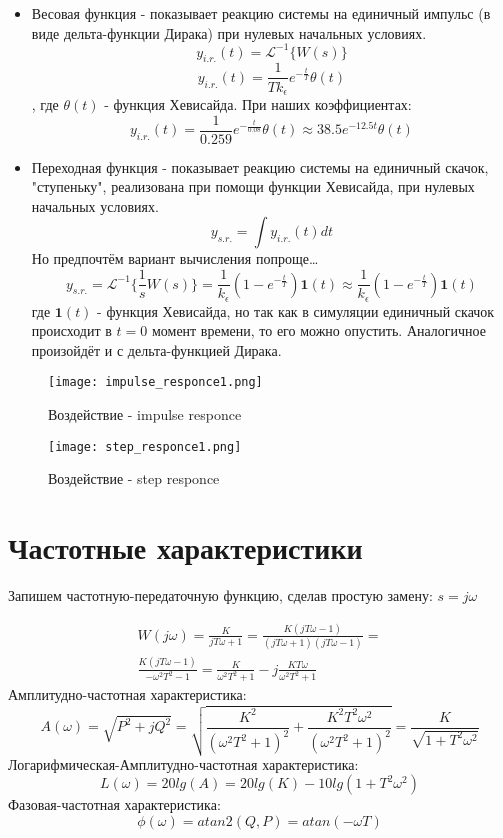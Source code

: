 \begin{itemize}

\item Весовая функция - показывает реакцию системы на единичный импульс (в виде дельта-функции Дирака) при нулевых начальных условиях.
$$
y_{i.r.}(t) = \mathcal{L}^{-1}\{W(s)\}
$$
$$
y_{i.r.}(t) = \frac{1}{Tk_\epsilon}e^{-\frac{t}{T}}\theta(t)
$$, где $\theta(t)$ - функция Хевисайда. При наших коэффициентах:
$$
y_{i.r.}(t) = \frac{1}{0.259}e^{-\frac{t}{0.08}}\theta(t) \approx 38.5e^{-12.5t}\theta(t)
$$

\item Переходная функция - показывает реакцию системы на единичный скачок, "ступеньку", реализована при помощи функции Хевисайда, при нулевых начальных условиях.
$$
y_{s.r.} = \int y_{i.r.}(t) dt
$$
Но предпочтём вариант вычисления попроще\dots
$$
y_{s.r.} = \mathcal{L}^{-1}\{\frac{1}{s}W(s)\} = \frac{1}{k_\epsilon}(1-e^{-\frac{t}{T}})\textbf{1}(t) \approx \frac{1}{k_\epsilon}(1-e^{-\frac{t}{T}})\textbf{1}(t)
$$
где $\textbf{1}(t)$ - функция Хевисайда, но так как в симуляции единичный скачок происходит в $t=0$ момент времени, то его можно опустить. Аналогичное произойдёт и с дельта-функцией Дирака.
\end{itemize}


\begin{figure}[ht]
  \centering
  \texttt{[image: impulse\_responce1.png]}
  \caption{Воздействие - \textrm{impulse responce}}
\end{figure}
\newpage
\begin{figure}[ht]
    \centering
    \texttt{[image: step\_responce1.png]}
    \caption{Воздействие - \textrm{step responce}}
  \end{figure}
\newpage

\section{Частотные характеристики}

Запишем частотную-передаточную функцию, сделав простую замену: $s = j\omega$

$$
\begin{aligned}
  W(j\omega) = \frac{K}{jT\omega + 1} = \frac{K(jT\omega - 1)}{(jT\omega + 1)(jT\omega - 1)} = \\
    \frac{K(jT \omega - 1)}{ -\omega^2 T^2 - 1} = \frac{K}{ \omega^2 T^2 + 1} - j\frac{KT\omega }{ \omega^2 T^2 + 1} 
\end{aligned}
$$
Амплитудно-частотная характеристика:
$$
A(\omega) = \sqrt{P^2 + jQ^2} = \sqrt{\frac{K^2}{(\omega^2 T^2 + 1)^2} + \frac{K^2T^2\omega^2}{(\omega^2 T^2 + 1)^2} } = \frac{K}{\sqrt{1+T^2\omega^2}}
$$
Логарифмическая-Амплитудно-частотная характеристика:
$$
L(\omega) = 20lg(A) = 20lg(K) - 10lg(1+T^2\omega^2)
$$
Фазовая-частотная характеристика:
$$
\phi(\omega) = atan2(Q,P) = atan(-\omega T)
$$

